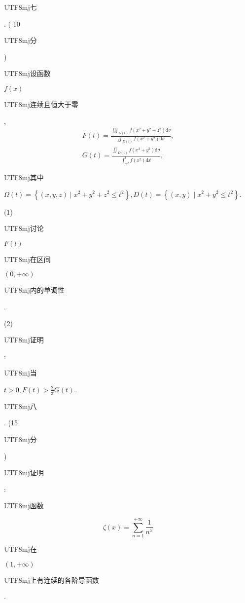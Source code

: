 \documentclass[10pt]{article}
\begin{document}
\begin{CJK}{UTF8}{mj}七\end{CJK}. ( 10 \begin{CJK}{UTF8}{mj}分\end{CJK}) \begin{CJK}{UTF8}{mj}设函数\end{CJK} $f(x)$ \begin{CJK}{UTF8}{mj}连续且恒大于零\end{CJK},
$$
\begin{array}{r}
F(t)=\frac{\iiint_{\Omega(t)} f\left(x^{2}+y^{2}+z^{2}\right) \mathrm{d} v}{\iint_{D(t)} f\left(x^{2}+y^{2}\right) \mathrm{d} \sigma}, \\
G(t)=\frac{\iint_{D(t)} f\left(x^{2}+y^{2}\right) \mathrm{d} \sigma}{\int_{-t}^{t} f\left(x^{2}\right) \mathrm{d} x},
\end{array}
$$
\begin{CJK}{UTF8}{mj}其中\end{CJK} $\Omega(t)=\left\{(x, y, z) \mid x^{2}+y^{2}+z^{2} \leqslant t^{2}\right\}, D(t)=\left\{(x, y) \mid x^{2}+y^{2} \leqslant t^{2}\right\}$.

(1) \begin{CJK}{UTF8}{mj}讨论\end{CJK} $F(t)$ \begin{CJK}{UTF8}{mj}在区间\end{CJK} $(0,+\infty)$ \begin{CJK}{UTF8}{mj}内的单调性\end{CJK}.

(2) \begin{CJK}{UTF8}{mj}证明\end{CJK}: \begin{CJK}{UTF8}{mj}当\end{CJK} $t>0, F(t)>\frac{2}{\pi} G(t)$.

\begin{CJK}{UTF8}{mj}八\end{CJK}. (15 \begin{CJK}{UTF8}{mj}分\end{CJK}) \begin{CJK}{UTF8}{mj}证明\end{CJK}: \begin{CJK}{UTF8}{mj}函数\end{CJK}
$$
\zeta(x)=\sum_{n=1}^{+\infty} \frac{1}{n^{x}}
$$
\begin{CJK}{UTF8}{mj}在\end{CJK} $(1,+\infty)$ \begin{CJK}{UTF8}{mj}上有连续的各阶导函数\end{CJK}.
\end{document}
